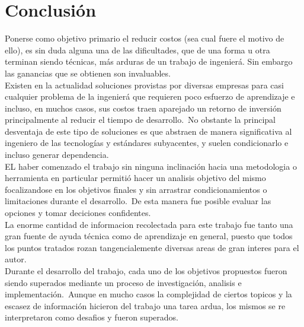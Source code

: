 \chapter{Conclusi\'on}

Ponerse como objetivo primario el reducir costos (sea cual fuere el motivo de
ello), es sin duda alguna una de las dificultades, que de una forma u otra
terminan siendo t\'ecnicas, m\'as arduras de un trabajo de ingenier\'a. Sin
embargo las ganancias que se obtienen son invaluables.\\

Existen en la actualidad soluciones provistas por diversas empresas para casi
cualquier problema de la ingenier\'a que requieren poco esfuerzo de aprendizaje
e incluso, en muchos casos, sus costos traen aparejado un retorno de
inversi\'on principalmente al reducir el tiempo de desarrollo.\
No obstante la principal desventaja de este tipo de soluciones es que abstraen
de manera significativa al ingeniero de las tecnolog\'ias y est\'andares
subyacentes, y suelen condicionarlo e incluso generar dependencia.\\

EL haber comenzado el trabajo sin ninguna inclinaci\'on hacia una metodologia
o herramienta en particular permiti\'o hacer un analisis objetivo del mismo
focalizandose en los objetivos finales y sin arrastrar condicionamientos
o limitaciones durante el desarrollo.\ 
De esta manera fue posible evaluar las opciones y tomar deciciones
confidentes.\\

La enorme cantidad de informacion recolectada para este trabajo fue tanto una
gran fuente de ayuda t\'ecnica como de aprendizaje en general, puesto que
todos los puntos tratados rozan tangencialemente diversas areas de gran
interes para el autor.\\

Durante el desarrollo del trabajo, cada uno de los objetivos propuestos fueron
siendo superados mediante un proceso de investigaci\'on, analisis e
implementaci\'on.\
Aunque en mucho casos la complejidad de ciertos topicos y la escasez de
informaci\'on hicieron del trabajo una tarea ardua, los mismos se re
interpretaron como desafios y fueron superados.\\




